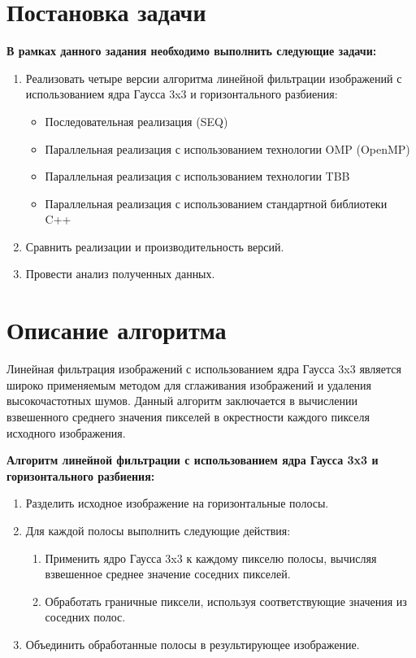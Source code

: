 \documentclass{report}
\begin{document}
\section*{Постановка задачи}
\par \textbf{В рамках данного задания необходимо выполнить следующие задачи:}
\begin{enumerate}
\item Реализовать четыре версии алгоритма линейной фильтрации изображений с использованием ядра Гаусса 3x3 и горизонтального разбиения:
\begin{itemize}
\item Последовательная реализация (SEQ)
\item Параллельная реализация с использованием технологии OMP (OpenMP)
\item Параллельная реализация с использованием технологии TBB
\item Параллельная реализация с использованием стандартной библиотеки C++
\end{itemize}
\item Сравнить реализации и производительность версий.
\item Провести анализ полученных данных.
\end{enumerate}
\newpage

\section*{Описание алгоритма}
\par Линейная фильтрация изображений с использованием ядра Гаусса 3x3 является широко применяемым методом для сглаживания изображений и удаления высокочастотных шумов. Данный алгоритм заключается в вычислении взвешенного среднего значения пикселей в окрестности каждого пикселя исходного изображения.

\par \textbf{Алгоритм линейной фильтрации с использованием ядра Гаусса 3x3 и горизонтального разбиения:}

\begin{enumerate}
\item Разделить исходное изображение на горизонтальные полосы.
\item Для каждой полосы выполнить следующие действия:
\begin{enumerate}
\item Применить ядро Гаусса 3x3 к каждому пикселю полосы, вычисляя взвешенное среднее значение соседних пикселей.
\item Обработать граничные пиксели, используя соответствующие значения из соседних полос.
\end{enumerate}
\item Объединить обработанные полосы в результирующее изображение.
\end{enumerate}
\end{document}

